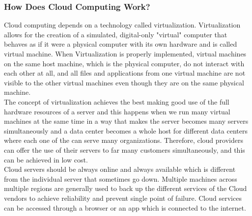 			\subsubsection{How Does Cloud Computing Work?}
			Cloud computing depends on a technology called virtualization. Virtualization allows for the creation of a simulated, digital-only "virtual" computer that behaves as if it were a physical computer with its own hardware and is called virtual machine. When Virtualization is properly implemented, virtual machines on the same host machine, which is the physical computer, do not interact with each other at all, and all files and applications from one virtual machine are not visible to the other virtual machines even though they are on the same physical machine. \\
			The concept of virtualization achieves the best making good use of the full hardware resources of a server and this happens when we run many virtual machines at the same time in a way that makes the server becomes many servers simultaneously and a data center becomes a whole host for different data centers where each one of the can serve many organizations. Therefore, cloud providers can offer the use of their servers to far many customers simultaneously, and this can be achieved in low cost. \\
			Cloud servers should be always online and always available which is different from the individual server that sometimes go down. Multiple machines across multiple regions are generally used to back up the different services of the Cloud vendors to achieve reliability and prevent single point of failure. Cloud services can be accessed through a browser or an app which is connected to the internet. 
			

